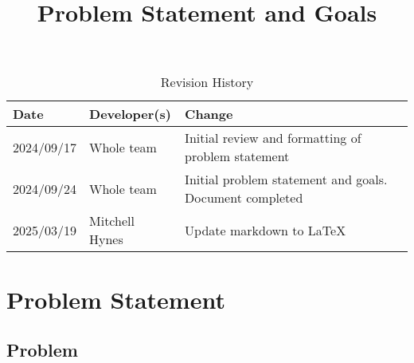 \documentclass{article}
\title{Problem Statement and Goals\\\progname}
\author{\authname}
\date{}
\begin{document}
\maketitle

\begin{table}[hp]
  \caption{Revision History} \label{TblRevisionHistory}
  \begin{tabularx}{\textwidth}{llX}
    \toprule
    \textbf{Date} & \textbf{Developer(s)} & \textbf{Change}\\
    \midrule
    2024/09/17 & Whole team & Initial review and formatting of problem statement\\
    2024/09/24 & Whole team & Initial problem statement and goals. Document completed\\
    2025/03/19 & Mitchell Hynes & Update markdown to \LaTeX \\
    \bottomrule
  \end{tabularx}
\end{table}

\section{Problem Statement}

\subsection{Problem}
\end{document}
